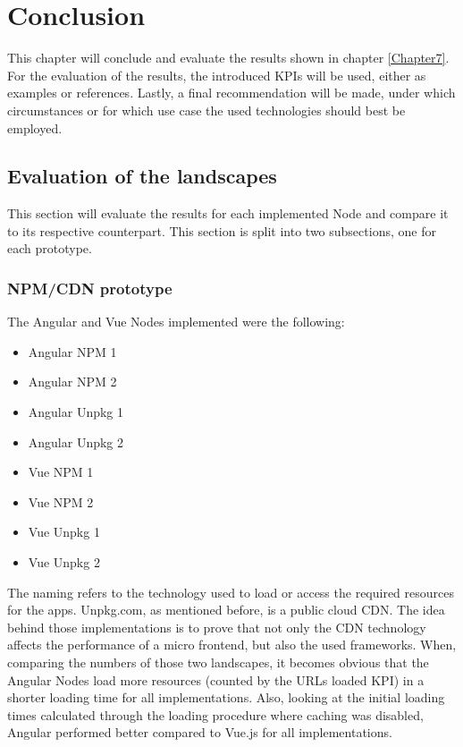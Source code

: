 \chapter{Conclusion} %
\label{Chapter8}


This chapter will conclude and evaluate the results shown in chapter \ref{Chapter7}. For the evaluation of the results, the introduced KPIs will be used, either as examples or references.
Lastly, a final recommendation will be made, under which circumstances or for which use case the used technologies should best be employed.
 
\section{Evaluation of the landscapes}

This section will evaluate the results for each implemented Node and compare it to its respective counterpart. This section is split into two subsections, one for each prototype.

\subsection{NPM/CDN prototype}

The Angular and Vue Nodes implemented were the following:

\begin{itemize}[noitemsep]
	\item Angular NPM 1
	\item Angular NPM 2
	\item Angular Unpkg 1
	\item Angular Unpkg 2
	\item Vue NPM 1
	\item Vue NPM 2
	\item Vue Unpkg 1
	\item Vue Unpkg 2
\end{itemize}

The naming refers to the technology used to load or access the required resources for the apps. 
Unpkg.com, as mentioned before, is a public cloud CDN. 
The idea behind those implementations is to prove that not only the CDN technology affects the performance of a micro frontend, but also the used frameworks.
When, comparing the numbers of those two landscapes, it becomes obvious that the Angular Nodes load more resources (counted by the URLs loaded KPI) in a shorter loading time for all implementations. 
Also, looking at the initial loading times calculated through the loading procedure where caching was disabled, Angular performed better compared to Vue.js for all implementations.

